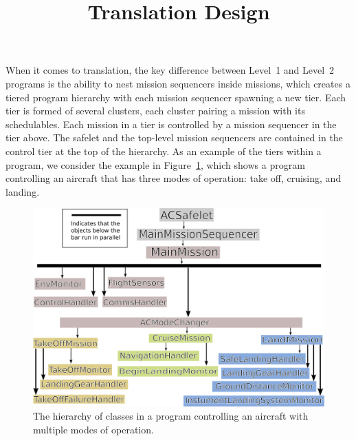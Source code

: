 \documentclass[10pt,a4paper]{article}
\begin{document}
\title{Translation Design}
\date{}
\maketitle


When it comes to translation, the key difference between Level~1 and Level~2 programs is the ability to nest mission sequencers inside missions, which creates a tiered program hierarchy with each mission sequencer spawning a new tier. Each tier is formed of several clusters, each cluster pairing a mission with its schedulables. Each mission in a tier is controlled by a mission sequencer in the tier above. The safelet and the top-level mission sequencers are contained in the control tier at the top of the hierarchy. As an example of the tiers within a program, we consider the example in Figure~\ref{fig:AircraftDiagram}, which shows a program controlling an aircraft that has three modes of operation: take off, cruising, and landing.

\begin{figure}[!h]
\begin{center}
\includegraphics[scale=1]{AircraftStructure.png}
\caption{The hierarchy of classes in a program controlling an aircraft with multiple modes of operation. \label{fig:AircraftDiagram}}
\end{center}
\end{figure}
\end{document}
